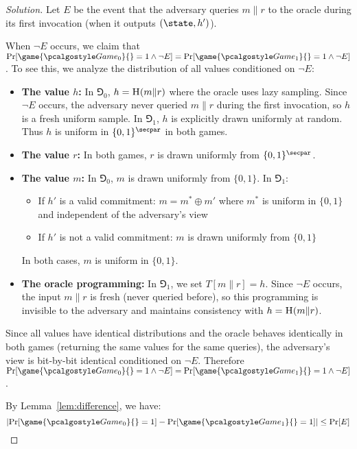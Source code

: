 \begin{proof}[Solution]
    Let $E$ be the event that the adversary queries $m \| r$ to the oracle during its first invocation (when it outputs $(\state, h')$).
  
  When $\neg E$ occurs, we claim that $\Pr[\game{\Game_0}{} = 1 \wedge \neg E] = \Pr[\game{\Game_1}{} = 1 \wedge \neg E]$. To see this, we analyze the distribution of all values conditioned on $\neg E$:
  
  \begin{itemize}
    \item \textbf{The value $h$:} In $\Game_0$, $h = {\normalfont\textsc{H}}(m \| r)$ where the oracle uses lazy sampling. Since $\neg E$ occurs, the adversary never queried $m \| r$ during the first invocation, so $h$ is a fresh uniform sample. In $\Game_1$, $h$ is explicitly drawn uniformly at random. Thus $h$ is uniform in $\{0,1\}^\secpar$ in both games.
    
    \item \textbf{The value $r$:} In both games, $r$ is drawn uniformly from $\{0,1\}^\secpar$.
    
    \item \textbf{The value $m$:} In $\Game_0$, $m$ is drawn uniformly from $\{0,1\}$. In $\Game_1$:
      \begin{itemize}
        \item If $h'$ is a valid commitment: $m = m^* \oplus m'$ where $m^*$ is uniform in $\{0,1\}$ and independent of the adversary's view
        \item If $h'$ is not a valid commitment: $m$ is drawn uniformly from $\{0,1\}$
      \end{itemize}
      In both cases, $m$ is uniform in $\{0,1\}$.
    
    \item \textbf{The oracle programming:} In $\Game_1$, we set $T[m \| r] = h$. Since $\neg E$ occurs, the input $m \| r$ is fresh (never queried before), so this programming is invisible to the adversary and maintains consistency with $h = {\normalfont\textsc{H}}(m \| r)$.
  \end{itemize}
  
  Since all values have identical distributions and the oracle behaves identically in both games (returning the same values for the same queries), the adversary's view is bit-by-bit identical conditioned on $\neg E$. Therefore $\Pr[\game{\Game_0}{} = 1 \wedge \neg E] = \Pr[\game{\Game_1}{} = 1 \wedge \neg E]$.
  
  By Lemma~\ref{lem:difference}, we have:
  \[
  \left|\Pr[\game{\Game_0}{} = 1] - \Pr[\game{\Game_1}{} = 1]\right| \leq \Pr[E]
  \]
  

\end{proof}
